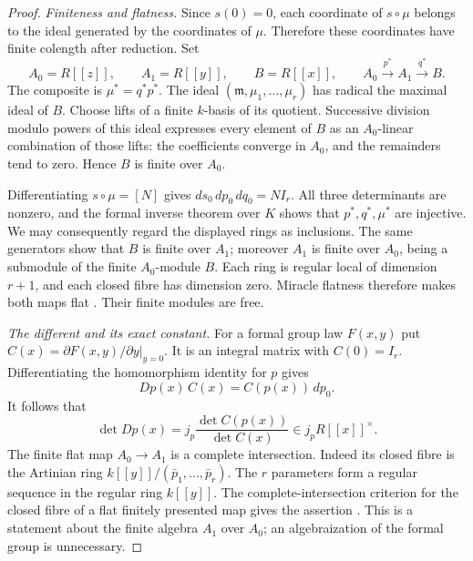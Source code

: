 \begin{proof}
\emph{Finiteness and flatness.}
Since $s(0)=0$, each coordinate of $s\circ\mu$ belongs to the ideal
generated by the coordinates of $\mu$.  Therefore these coordinates have
finite colength after reduction.  Set
\[
 A_0=R[[z]],\qquad A_1=R[[y]],\qquad B=R[[x]],
       \qquad A_0\xrightarrow{p^*}A_1\xrightarrow{q^*}B.
\]
The composite is $\mu^*=q^*p^*$.  The ideal
$(\mathfrak m,\mu_1,\ldots,\mu_r)$ has radical the maximal ideal of $B$.
Choose lifts of a finite $k$-basis of its quotient.  Successive division
modulo powers of this ideal expresses every element of $B$ as an
$A_0$-linear combination of those lifts: the coefficients converge in
$A_0$, and the remainders tend to zero.  Hence $B$ is finite over $A_0$.

Differentiating $s\circ\mu=[N]$ gives
$ds_0\,dp_0\,dq_0=N I_r$.  All three determinants are nonzero, and the
formal inverse theorem over $K$ shows that $p^*,q^*,\mu^*$ are injective.
We may consequently regard the displayed rings as inclusions.
The same generators show that $B$ is finite over $A_1$; moreover $A_1$
is finite over $A_0$, being a submodule of the finite $A_0$-module $B$.
Each ring is regular local of dimension $r+1$, and each closed fibre has
dimension zero.  Miracle flatness therefore makes both maps flat
\cite{stacks-formal-trace-flatness}.  Their finite modules are free.

\emph{The different and its exact constant.}
For a formal group law $F(x,y)$ put
$C(x)=\partial F(x,y)/\partial y|_{y=0}$.  It is an integral matrix with
$C(0)=I_r$.  Differentiating the homomorphism identity for $p$ gives
\[
                 Dp(x)\,C(x)=C(p(x))\,dp_0.
\]
It follows that
\begin{equation}\label{eq:formal-jacobian-unit}
        \det Dp(x)=j_p\frac{\det C(p(x))}{\det C(x)}
                                      \in j_p R[[x]]^\times.
\end{equation}
The finite flat map $A_0\to A_1$ is a complete intersection.
Indeed its closed fibre is the Artinian ring
$k[[y]]/(\bar p_1,\ldots,\bar p_r)$.  The $r$ parameters form a regular
sequence in the regular ring $k[[y]]$.  The complete-intersection criterion
for the closed fibre of a flat finitely presented map gives the assertion
\cite{stacks-formal-trace-syntomic}.
This is a statement about the finite algebra $A_1$ over $A_0$; an
algebraization of the formal group is unnecessary.


\end{proof}
